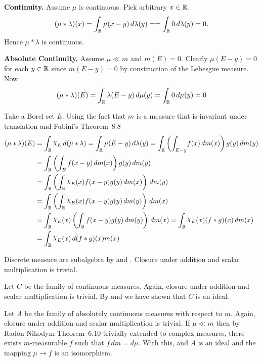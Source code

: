 \begin{enumerate}
\begin{itemize}
\textbf{Continuity.}
Assume \(\mu\) is continuous. Pick arbitrary \(x\in\mathbb{R}\).
\begin{equation*}
(\mu\ast\lambda)(x) 
= \int_{\mathbb{R}} \mu(x-y)\,d\lambda(y) = 
= \int_{\mathbb{R}} 0\,d\lambda(y) = 0.
\end{equation*}
Hence \(\mu\ast\lambda\) is continuous.

\textbf{Absolute Continuity.}
Assume \(\mu \ll m\) and \(m(E)=0\). 
Clearly \(\mu(E-y)=0\) for each \(y\in\mathbb{R}\) since \(m(E-y)=0\)
by construction of the Lebesgue measure. Now
\begin{equation*}
(\mu\ast \lambda)(E) 
= \int_{\mathbb{R}} \lambda(E-y)\,d\mu(y)
= \int_{\mathbb{R}} 0\,d\mu(y) = 0
\end{equation*}

Take a Borel set $E$. Using the fact that $m$ is a measure that 
is invariant under translation and 
Fubini's Theorem~8.8
\begin{align*}
(\mu\ast\lambda)(E)
&= \int_{\R} \chhi_E\,d(\mu\ast\lambda)
 = \int_{\R} \mu(E-y)\,d\lambda(y)
 = \int_{\R} \left(\int_{E-y}\!f(x)\,dm(x)\right)g(y)\,dm(y) \\
&= \int_{\R} \left(\int_E f(x-y)\,dm(x)\right)g(y)\,dm(y) \\
&= \int_{\R} \left(\int_{\R} \chhi_E(x) f(x-y)g(y)\,dm(x)\right)\,dm(y) \\
&= \int_{\R} \left(\int_{\R} \chhi_E(x) f(x-y)g(y)\,dm(y)\right)\,dm(x) \\
&= \int_{\R} \chhi_E(x) \left(\int_{\R} f(x-y)g(y)\,dm(y)\right)\,dm(x) 
 = \int_{\R} \chhi_E(x) (f\ast g)(x)\,dm(x) \\
&= \int_{\R} \chhi_E(x)\,d(f\ast g)(x)m(x)
\end{align*}


Discrete measure are subalgebra by  and .
Closure under addition and scalar multiplication is trivial.

Let $C$ be the family of continuous measures.
Again, closure under addition and scalar multiplication is trivial.
By  and  we have shown that $C$ is an ideal.

Let $A$ be the family of absolutely continuous measures with respect to $m$.
Again, closure under addition and scalar multiplication is trivial.
If \(\mu\ll m\) then by 
Radon-Nikodym Theorem~6.10 trivially extended to complex measures,
there exists $m$-measurable $f$
such that \(f\,dm = d\mu\). With this, and  $A$ is an ideal
and the mapping \(\mu \to f\) is an isomorphism.



\end{itemize}
\end{enumerate}
